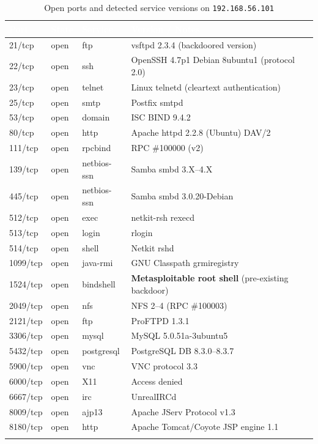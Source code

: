 \documentclass[11pt,a4paper]{article}
\begin{document}
\begin{longtable}{p{1.6cm} p{1.4cm} p{2.6cm} p{7.4cm}}
\toprule
\rowcolor{navy}
\textcolor{white}{\textbf{Port}} & \textcolor{white}{\textbf{State}} & \textcolor{white}{\textbf{Service}} & \textcolor{white}{\textbf{Version / Notes}} \\
\midrule
\endhead
21/tcp & open & ftp & vsftpd 2.3.4 (backdoored version) \\
22/tcp & open & ssh & OpenSSH 4.7p1 Debian 8ubuntu1 (protocol 2.0) \\
23/tcp & open & telnet & Linux telnetd (cleartext authentication) \\
25/tcp & open & smtp & Postfix smtpd \\
53/tcp & open & domain & ISC BIND 9.4.2 \\
80/tcp & open & http & Apache httpd 2.2.8 (Ubuntu) DAV/2 \\
111/tcp & open & rpcbind & RPC \#100000 (v2) \\
139/tcp & open & netbios-ssn & Samba smbd 3.X--4.X \\
445/tcp & open & netbios-ssn & Samba smbd 3.0.20-Debian \\
512/tcp & open & exec & netkit-rsh rexecd \\
513/tcp & open & login & rlogin \\
514/tcp & open & shell & Netkit rshd \\
1099/tcp & open & java-rmi & GNU Classpath grmiregistry \\
1524/tcp & open & bindshell & \textbf{Metasploitable root shell} (pre-existing backdoor) \\
2049/tcp & open & nfs & NFS 2--4 (RPC \#100003) \\
2121/tcp & open & ftp & ProFTPD 1.3.1 \\
3306/tcp & open & mysql & MySQL 5.0.51a-3ubuntu5 \\
5432/tcp & open & postgresql & PostgreSQL DB 8.3.0--8.3.7 \\
5900/tcp & open & vnc & VNC protocol 3.3 \\
6000/tcp & open & X11 & Access denied \\
6667/tcp & open & irc & UnrealIRCd \\
8009/tcp & open & ajp13 & Apache JServ Protocol v1.3 \\
8180/tcp & open & http & Apache Tomcat/Coyote JSP engine 1.1 \\
\bottomrule
\caption{Open ports and detected service versions on \texttt{192.168.56.101}}
\end{longtable}
\end{document}
